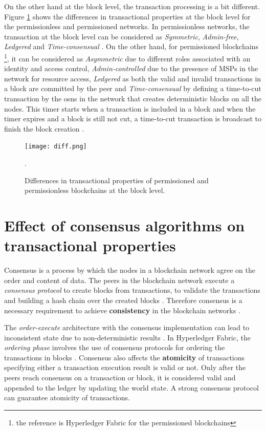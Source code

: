 \documentclass[
  a4paper,  %
  twoside,  %
  bibliography=totoc,
  headsepline,
  cleardoublepage=empty,
  parskip=half,
  draft=false
]{scrbook}
\begin{document}
On the other hand at the block level, the transaction processing is a bit different. Figure \ref{fig:diff} shows the differences in transactional properties at the block level for the permissionless and permissioned networks. In permissionless networks, the transaction at the block level can be considered as \textit{Symmetric}, \textit{Admin-free}, \textit{Ledgered} and \textit{Time-consensual} \cite{Salt}. On the other hand, for permissioned blockchains \footnote{the reference is Hyperledger Fabric for the permissioned blockchains}, it can be considered as \textit{Asymmetric} due to different roles associated with an identity and access control, \textit{Admin-controlled} due to the presence of MSPs in the network for resource access, \textit{Ledgered} as both the valid and invalid transactions in a block are committed by the peer and \textit{Time-consensual} by defining a time-to-cut transaction by the \glspl{osn} in the network that creates deterministic blocks on all the nodes. This timer starts when a transaction is included in a block and when the timer expires and a block is still not cut, a time-to-cut transaction is broadcast to finish the block creation \cite{HF}.



\begin{figure}[h!]
\begin{center}
\texttt{[image: diff.png]}
\caption{Differences in transactional properties of permissioned and permissionless blockchains at the block level.}.
\label{fig:diff}
\end{center}
\end{figure}

\section{Effect of consensus algorithms on transactional properties}
Consensus is a process by which the nodes in a blockchain network agree on the order and content of data. The peers in the blockchain network execute a \textit{consensus protocol} to create blocks from transactions, to validate the transactions and building a hash chain over the created blocks \cite{HF}. Therefore consensus is a necessary requirement to achieve \textbf{consistency} in the blockchain networks \cite{HF}.

The \textit{order-execute} architecture with the consensus implementation can lead to inconsistent state due to non-deterministic results \cite{HF}. In Hyperledger Fabric, the \textit{ordering phase} involves the use of consensus protocols for ordering the transactions in blocks \cite{HF}. Consensus also affects the \textbf{atomicity} of transactions specifying either a transaction execution result is valid or not. Only after the peers reach consensus on a transaction or block, it is considered valid and appended to the ledger by updating the world state. A strong consensus protocol can guarantee atomicity of transactions. 
\end{document}
